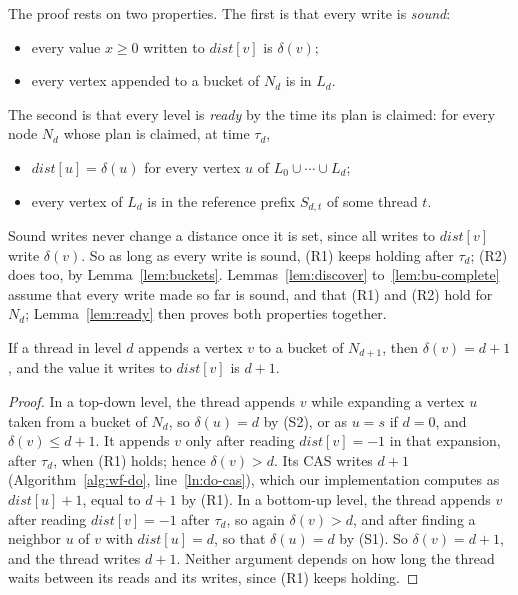 The proof rests on two properties. The first is that every write is \emph{sound}:
\begin{itemize}
    \item[(S1)] every value $x \geq 0$ written to $\mathit{dist}[v]$ is $\delta(v)$;
    \item[(S2)] every vertex appended to a bucket of $N_d$ is in $L_d$.
\end{itemize}
The second is that every level is \emph{ready} by the time its plan is claimed: for every node $N_d$ whose plan is claimed, at time $\tau_d$,
\begin{itemize}
    \item[(R1)] $\mathit{dist}[u] = \delta(u)$ for every vertex $u$ of $L_0 \cup \cdots \cup L_d$;
    \item[(R2)] every vertex of $L_d$ is in the reference prefix $S_{d,t}$ of some thread $t$.
\end{itemize}
Sound writes never change a distance once it is set, since all writes to $\mathit{dist}[v]$ write $\delta(v)$. So as long as every write is sound, (R1) keeps holding after $\tau_d$; (R2) does too, by Lemma~\ref{lem:buckets}. Lemmas~\ref{lem:discover} to~\ref{lem:bu-complete} assume that every write made so far is sound, and that (R1) and (R2) hold for $N_d$; Lemma~\ref{lem:ready} then proves both properties together.

\begin{lemma}[Discoveries]
\label{lem:discover}
If a thread in level $d$ appends a vertex $v$ to a bucket of $N_{d+1}$, then $\delta(v) = d+1$, and the value it writes to $\mathit{dist}[v]$ is $d+1$.
\end{lemma}
\begin{proof}
In a top-down level, the thread appends $v$ while expanding a vertex $u$ taken from a bucket of $N_d$, so $\delta(u) = d$ by (S2), or as $u = s$ if $d = 0$, and $\delta(v) \leq d + 1$. It appends $v$ only after reading $\mathit{dist}[v] = -1$ in that expansion, after $\tau_d$, when (R1) holds; hence $\delta(v) > d$. Its CAS writes $d+1$ (Algorithm~\ref{alg:wf-do}, line~\ref{ln:do-cas}), which our implementation computes as $\mathit{dist}[u]+1$, equal to $d+1$ by (R1). In a bottom-up level, the thread appends $v$ after reading $\mathit{dist}[v] = -1$ after $\tau_d$, so again $\delta(v) > d$, and after finding a neighbor $u$ of $v$ with $\mathit{dist}[u] = d$, so that $\delta(u) = d$ by (S1). So $\delta(v) = d+1$, and the thread writes $d+1$. Neither argument depends on how long the thread waits between its reads and its writes, since (R1) keeps holding.
\end{proof}

